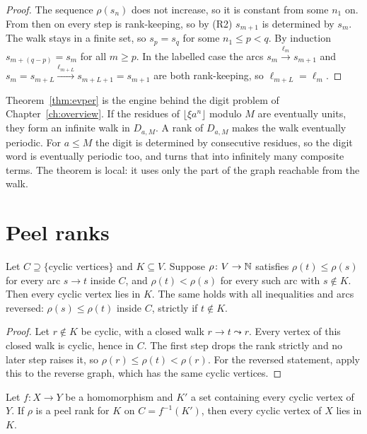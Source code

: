 \begin{proof}
The sequence \(\rho(s_n)\) does not increase, so it is constant from some \(n_1\) on. From then
on every step is rank-keeping, so by (R2) \(s_{m+1}\) is determined by \(s_m\). The walk stays
in a finite set, so \(s_p=s_q\) for some \(n_1\le p<q\). By induction \(s_{m+(q-p)}=s_m\) for
all \(m\ge p\). In the labelled case the arcs \(s_m\xrightarrow{\ell_m}s_{m+1}\) and
\(s_m=s_{m+L}\xrightarrow{\ell_{m+L}}s_{m+L+1}=s_{m+1}\) are both rank-keeping, so
\(\ell_{m+L}=\ell_m\).
\end{proof}

Theorem~\ref{thm:evper} is the engine behind the digit problem of Chapter~\ref{ch:overview}.
If the residues of \(\lfloor\xi a^n\rfloor\) modulo \(M\) are eventually units, they form an
infinite walk in \(D_{a,M}\). A rank of \(D_{a,M}\) makes the walk eventually periodic. For
\(a\le M\) the digit is determined by consecutive residues, so the digit word is eventually
periodic too, and \cite[Theorem~4]{Dub09} turns that into infinitely many composite terms.
The theorem is local: it uses only the part of the graph reachable from the walk.

\section{Peel ranks}

\begin{theorem}\label{thm:peel}
Let \(C\supseteq\{\text{cyclic vertices}\}\) and \(K\subseteq V\). Suppose
\(\rho\colon V\to\mathbb{N}\) satisfies \(\rho(t)\le\rho(s)\) for every arc \(s\to t\) inside \(C\), and
\(\rho(t)<\rho(s)\) for every such arc with \(s\notin K\). Then every cyclic vertex lies in
\(K\). The same holds with all inequalities and arcs reversed: \(\rho(s)\le\rho(t)\) inside
\(C\), strictly if \(t\notin K\).
\end{theorem}

\begin{proof}
Let \(r\notin K\) be cyclic, with a closed walk \(r\to t\leadsto r\). Every vertex of this
closed walk is cyclic, hence in \(C\). The first step drops the rank strictly and no later step
raises it, so \(\rho(r)\le\rho(t)<\rho(r)\). For the reversed statement, apply this to the
reverse graph, which has the same cyclic vertices.
\end{proof}

\begin{corollary}[rungs]\label{cor:rung}
Let \(f\colon X\to Y\) be a homomorphism and \(K'\) a set containing every cyclic vertex of
\(Y\). If \(\rho\) is a peel rank for \(K\) on \(C=f^{-1}(K')\), then every cyclic vertex of
\(X\) lies in \(K\).
\end{corollary}

